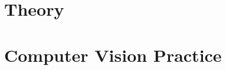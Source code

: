 \documentclass{book}
\begin{document}
\frontmatter




\mainmatter
\tableofcontents

\part{Theory}









\part{Computer Vision Practice}








\backmatter


\end{document}
